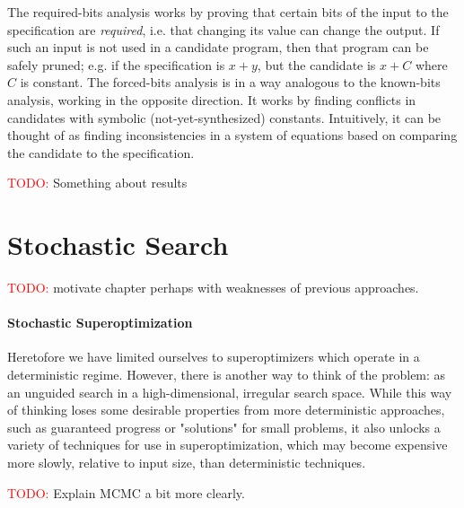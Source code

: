 \documentclass[12pt,twoside]{reedthesis}
\newcommand{\red}[1]{\textcolor{red}{#1}}
\newcommand{\addressed}[2]{{#1}}
\begin{document}
The required-bits analysis works by proving that certain bits of the input to the specification are \textit{required}, i.e. that changing its value can change the output.
    If such an input is not used in a candidate program, then that program can be safely pruned;
        e.g. if the specification is $x + y$, but the candidate is $x + C$ where $C$ is constant.
The forced-bits analysis is in a way analogous to the known-bits analysis, working in the opposite direction.
    It works by finding conflicts in candidates with symbolic (not-yet-synthesized) constants.
    Intuitively, it can be thought of as finding inconsistencies in a system of equations based on comparing the candidate to the specification. %
    
\red{TODO:} Something about results
    

\chapter{Stochastic Search}
\red{TODO:} motivate chapter perhaps with weaknesses of previous approaches.
    
\subsubsection{Stochastic Superoptimization}
Heretofore we have limited ourselves to superoptimizers which operate in a deterministic regime.
However, there is another way to think of the problem: as an unguided search in a high-dimensional, irregular search space.
While this way of thinking loses some desirable properties from more deterministic approaches, such as guaranteed progress or "solutions" for small problems, it also unlocks a variety of techniques for use in superoptimization, which may 
    become expensive more slowly, relative to input size, than deterministic techniques.
    
\red{TODO:} Explain MCMC a bit more clearly.
    
\end{document}
